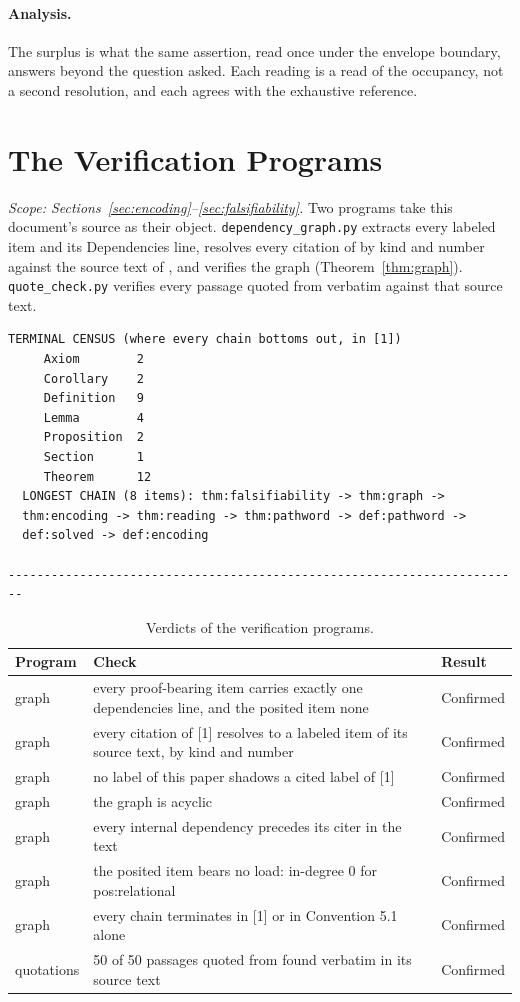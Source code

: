 \documentclass[pdflatex,sn-mathphys-num]{sn-jnl}
\theoremstyle{thmstyleone}%
\theoremstyle{thmstyletwo}%
\theoremstyle{thmstylethree}%
\newcommand{\PA}{\cite{Swanagon2026PA}}
\begin{document}
\begin{appendices}
\paragraph{Analysis.} The surplus is what the same assertion, read once under the envelope boundary, answers beyond the question asked. Each reading is a read of the occupancy, not a second resolution, and each agrees with the exhaustive reference.

\section{The Verification Programs}\label{app:F}
\emph{Scope: Sections~\ref{sec:encoding}--\ref{sec:falsifiability}.} Two programs take this document's source as their object. \texttt{dependency\_graph.py} extracts every labeled item and its Dependencies line, resolves every citation of \PA{} by kind and number against the source text of \PA{}, and verifies the graph (Theorem~\ref{thm:graph}). \texttt{quote\_check.py} verifies every passage quoted from \PA{} verbatim against that source text.

{\footnotesize\begin{verbatim}
TERMINAL CENSUS (where every chain bottoms out, in [1])
     Axiom        2
     Corollary    2
     Definition   9
     Lemma        4
     Proposition  2
     Section      1
     Theorem      12
  LONGEST CHAIN (8 items): thm:falsifiability -> thm:graph ->
  thm:encoding -> thm:reading -> thm:pathword -> def:pathword ->
  def:solved -> def:encoding

------------------------------------------------------------------------
\end{verbatim}}
\begin{table}[htbp]
\centering
\caption{Verdicts of the verification programs.}\label{tab:appF_results}
\renewcommand{\arraystretch}{1.25}
\small
\begin{tabular}{@{} p{} p{} p{} @{}}
\toprule
\textbf{Program} & \textbf{Check} & \textbf{Result} \\
\midrule
graph & every proof-bearing item carries exactly one dependencies line, and the posited item none & Confirmed \\
graph & every citation of [1] resolves to a labeled item of its source text, by kind and number & Confirmed \\
graph & no label of this paper shadows a cited label of [1] & Confirmed \\
graph & the graph is acyclic & Confirmed \\
graph & every internal dependency precedes its citer in the text & Confirmed \\
graph & the posited item bears no load: in-degree 0 for pos:relational & Confirmed \\
graph & every chain terminates in [1] or in Convention 5.1 alone & Confirmed \\
quotations & 50 of 50 passages quoted from \PA{} found verbatim in its source text & Confirmed \\
\bottomrule
\end{tabular}
\end{table}


\end{appendices}
\end{document}
